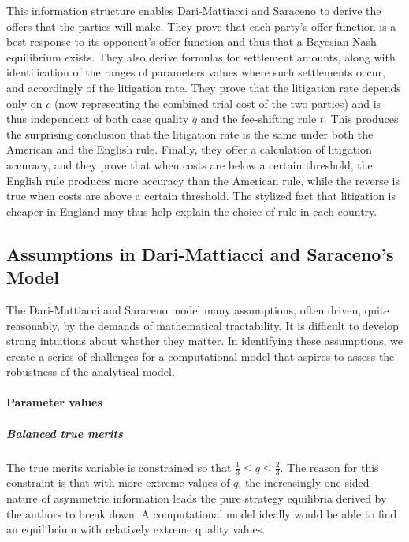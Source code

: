 \documentclass{article}
\begin{document}
This information structure enables Dari-Mattiacci and Saraceno to derive the offers that the parties will make. They prove that each party's offer function is a best response to its opponent's offer function and thus that a Bayesian Nash equilibrium exists. They also derive formulas for settlement amounts, along with identification of the ranges of parameters values where such settlements occur, and accordingly of the litigation rate. They prove that the litigation rate depends only on $c$ (now representing the combined trial cost of the two parties) and is thus independent of both case quality $q$ and the fee-shifting rule $t$. This produces the surprising conclusion that the litigation rate is the same under both the American and the English rule. Finally, they offer a calculation of litigation accuracy, and they prove that when costs are below a certain threshold, the English rule produces more accuracy than the American rule, while the reverse is true when costs are above a certain threshold. The stylized fact that litigation is cheaper in England may thus help explain the choice of rule in each country.

\subsection{Assumptions in Dari-Mattiacci and Saraceno's Model}\label{subsection:Assumptions}

The Dari-Mattiacci and Saraceno model many assumptions, often driven, quite reasonably, by the demands of mathematical tractability. It is difficult to develop strong intuitions about whether they matter. In identifying these assumptions, we create a series of challenges for a computational model that aspires to assess the robustness of the analytical model.

\paragraph{Parameter values}
\subparagraph{Balanced true merits}The true merits variable is constrained so that $\frac{1}{3} \leq q \leq \frac{2}{3}$. The reason for this constraint is that with more extreme values of $q$, the increasingly one-sided nature of asymmetric information leads the pure strategy equilibria derived by the authors to break down. A computational model ideally would be able to find an equilibrium with relatively extreme quality values.
\end{document}
